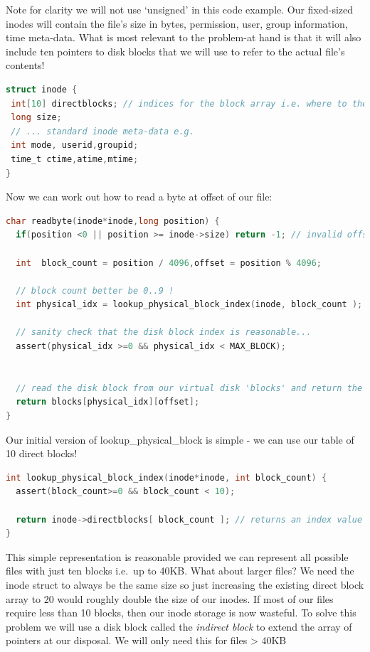 Note for clarity we will not use `unsigned' in this code example. Our fixed-sized inodes will contain the file's size in bytes, permission, user, group information, time meta-data. What is most relevant to the problem-at hand is that it will also include ten pointers to disk blocks that we will use to refer to the actual file's contents!

\begin{lstlisting}[language=C]
struct inode {
 int[10] directblocks; // indices for the block array i.e. where to the find the file's content
 long size;
 // ... standard inode meta-data e.g.
 int mode, userid,groupid;
 time_t ctime,atime,mtime;
}
\end{lstlisting}

Now we can work out how to read a byte at offset  of our file:

\begin{lstlisting}[language=C]
char readbyte(inode*inode,long position) {
  if(position <0 || position >= inode->size) return -1; // invalid offset

  int  block_count = position / 4096,offset = position % 4096;

  // block count better be 0..9 !
  int physical_idx = lookup_physical_block_index(inode, block_count );

  // sanity check that the disk block index is reasonable...
  assert(physical_idx >=0 && physical_idx < MAX_BLOCK);


  // read the disk block from our virtual disk 'blocks' and return the specific byte
  return blocks[physical_idx][offset];
}
\end{lstlisting}

Our initial version of lookup\_physical\_block is simple - we can use our table of 10 direct blocks!

\begin{lstlisting}[language=C]
int lookup_physical_block_index(inode*inode, int block_count) {
  assert(block_count>=0 && block_count < 10);

  return inode->directblocks[ block_count ]; // returns an index value between [0,MAX_BLOCK)
}
\end{lstlisting}

This simple representation is reasonable provided we can represent all possible files with just ten blocks i.e.~up to 40KB. What about larger files? We need the inode struct to always be the same size so just increasing the existing direct block array to 20 would roughly double the size of our inodes. If most of our files require less than 10 blocks, then our inode storage is now wasteful. To solve this problem we will use a disk block called the \emph{indirect block} to extend the array of pointers at our disposal. We will only need this for files \textgreater{} 40KB

